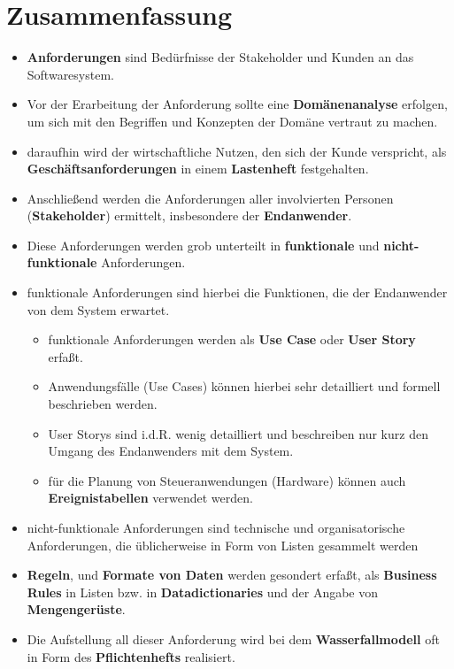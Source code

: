 \section{Zusammenfassung}



\begin{itemize}
    \item \textbf{Anforderungen} sind Bedürfnisse der Stakeholder und Kunden an das Softwaresystem.
    \item Vor der Erarbeitung der Anforderung sollte eine \textbf{Domänenanalyse} erfolgen, um sich mit den Begriffen und Konzepten der Domäne vertraut zu machen.
    \item daraufhin wird der wirtschaftliche Nutzen, den sich der Kunde verspricht, als \textbf{Geschäftsanforderungen} in einem \textbf{Lastenheft} festgehalten.
    \item Anschließend werden die Anforderungen aller involvierten Personen (\textbf{Stakeholder}) ermittelt, insbesondere der \textbf{Endanwender}.
    \item Diese Anforderungen werden grob unterteilt in \textbf{funktionale} und \textbf{nicht-funktionale} Anforderungen.
    \item funktionale Anforderungen sind hierbei die Funktionen, die der Endanwender von dem System erwartet.
        \begin{itemize}
            \item funktionale Anforderungen werden als \textbf{Use Case} oder \textbf{User Story} erfaßt.
            \item Anwendungsfälle (Use Cases) können hierbei sehr detailliert und formell beschrieben werden.
            \item User Storys sind i.d.R. wenig detailliert und beschreiben nur kurz den Umgang des Endanwenders mit dem System.
            \item für die Planung von Steueranwendungen (Hardware) können auch \textbf{Ereignistabellen} verwendet werden.
        \end{itemize}
    \item nicht-funktionale Anforderungen sind technische und organisatorische Anforderungen, die üblicherweise in Form von Listen gesammelt werden
    \item \textbf{Regeln}, und \textbf{Formate von Daten} werden gesondert erfaßt, als \textbf{Business Rules} in Listen bzw. in \textbf{Datadictionaries} und der Angabe von \textbf{Mengengerüste}.
    \item Die Aufstellung all dieser Anforderung wird bei dem \textbf{Wasserfallmodell} oft in Form des \textbf{Pflichtenhefts} realisiert.
\end{itemize}


